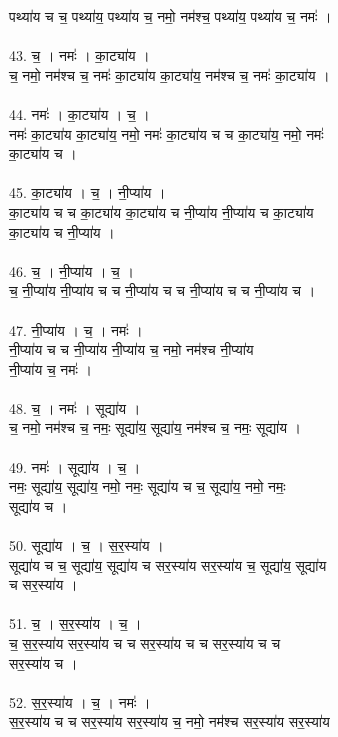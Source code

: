 पथ्या॑य च च॒ पथ्या॑य॒ पथ्या॑य च॒ नमो॒ नम॑श्च॒ पथ्या॑य॒ पथ्या॑य च॒ नमः॑ ।\\
\\
43. च॒ । नमः॑ । का॒ट्या॑य ।\\
च॒ नमो॒ नम॑श्च च॒ नमः॑ का॒ट्या॑य का॒ट्या॑य॒ नम॑श्च च॒ नमः॑ का॒ट्या॑य ।\\
\\
44. नमः॑ । का॒ट्या॑य । च॒ ।\\
नमः॑ का॒ट्या॑य का॒ट्या॑य॒ नमो॒ नमः॑ का॒ट्या॑य च च का॒ट्या॑य॒ नमो॒ नमः॑\\
का॒ट्या॑य च ।\\
\\
45. का॒ट्या॑य । च॒ । नी॒प्या॑य ।\\
का॒ट्या॑य च च का॒ट्या॑य का॒ट्या॑य च नी॒प्या॑य नी॒प्या॑य च का॒ट्या॑य\\
का॒ट्या॑य च नी॒प्या॑य ।\\
\\
46. च॒ । नी॒प्या॑य । च॒ ।\\
च॒ नी॒प्या॑य नी॒प्या॑य च च नी॒प्या॑य च च नी॒प्या॑य च च नी॒प्या॑य च ।\\
\\
47. नी॒प्या॑य । च॒ । नमः॑ ।\\
नी॒प्या॑य च च नी॒प्या॑य नी॒प्या॑य च॒ नमो॒ नम॑श्च नी॒प्या॑य\\
नी॒प्या॑य च॒ नमः॑ ।\\
\\
48. च॒ । नमः॑ । सूद्या॑य ।\\
च॒ नमो॒ नम॑श्च च॒ नमः॒ सूद्या॑य॒ सूद्या॑य॒ नम॑श्च च॒ नमः॒ सूद्या॑य ।\\
\\
49. नमः॑ । सूद्या॑य । च॒ ।\\
नमः॒ सूद्या॑य॒ सूद्या॑य॒ नमो॒ नमः॒ सूद्या॑य च च॒ सूद्या॑य॒ नमो॒ नमः॒\\
सूद्या॑य च ।\\
\\
50. सूद्या॑य । च॒ । स॒र॒स्या॑य ।\\
सूद्या॑य च च॒ सूद्या॑य॒ सूद्या॑य च सर॒स्या॑य सर॒स्या॑य च॒ सूद्या॑य॒ सूद्या॑य\\
च सर॒स्या॑य ।\\
\\
51. च॒ । स॒र॒स्या॑य । च॒ ।\\
च॒ स॒र॒स्या॑य सर॒स्या॑य च च सर॒स्या॑य च च सर॒स्या॑य च च\\
सर॒स्या॑य च ।\\
\\
52. स॒र॒स्या॑य । च॒ । नमः॑ ।\\
स॒र॒स्या॑य च च सर॒स्या॑य सर॒स्या॑य च॒ नमो॒ नम॑श्च सर॒स्या॑य सर॒स्या॑य\\
